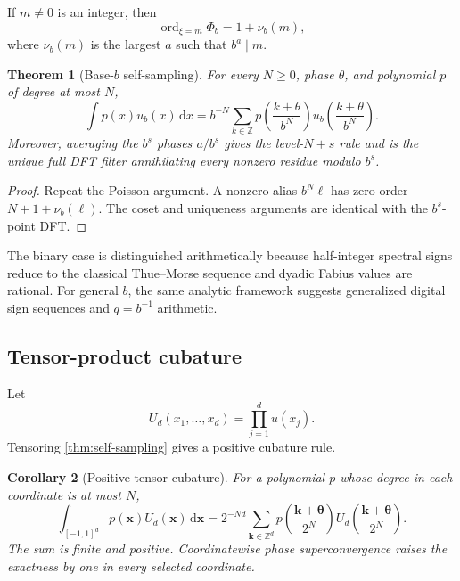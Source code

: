 \documentclass[11pt]{article}
\numberwithin{equation}{section}
\newtheorem{theorem}{Theorem}[section]
\newtheorem{corollary}[theorem]{Corollary}
\theoremstyle{definition}
\theoremstyle{remark}
\DeclareMathOperator{\ord}{ord}
\newcommand{\Z}{\mathbb Z}
\newcommand{\dd}{\,\mathrm d}
\begin{document}
If $m\ne0$ is an integer, then
\begin{equation}
 \ord_{\xi=m}\Phi_b=1+\nu_b(m),
 \label{eq:b-multiplicity}
\end{equation}
where $\nu_b(m)$ is the largest $a$ such that $b^a\mid m$.

\begin{theorem}[Base-$b$ self-sampling]
\label{thm:base-b}
For every $N\ge0$, phase $\theta$, and polynomial $p$ of degree at most $N$,
\begin{equation}
 \int p(x)u_b(x)\dd x
 =b^{-N}\sum_{k\in\Z}
 p\!\left(\frac{k+\theta}{b^N}\right)
 u_b\!\left(\frac{k+\theta}{b^N}\right).
 \label{eq:base-b-self-sampling}
\end{equation}
Moreover, averaging the $b^s$ phases $a/b^s$ gives the level-$N+s$ rule and is the unique full DFT filter annihilating every nonzero residue modulo $b^s$.
\end{theorem}

\begin{proof}
Repeat the Poisson argument.  A nonzero alias $b^N\ell$ has zero order $N+1+\nu_b(\ell)$.  The coset and uniqueness arguments are identical with the $b^s$-point DFT.
\end{proof}

The binary case is distinguished arithmetically because half-integer spectral signs reduce to the classical Thue--Morse sequence and dyadic Fabius values are rational.  For general $b$, the same analytic framework suggests generalized digital sign sequences and $q=b^{-1}$ arithmetic.

\subsection{Tensor-product cubature}

Let
\begin{equation}
 U_d(x_1,\ldots,x_d)=\prod_{j=1}^{d}u(x_j).
 \label{eq:tensor-density}
\end{equation}
Tensoring \cref{thm:self-sampling} gives a positive cubature rule.

\begin{corollary}[Positive tensor cubature]
\label{cor:tensor-cubature}
For a polynomial $p$ whose degree in each coordinate is at most $N$,
\begin{equation}
 \int_{[-1,1]^d}p(\bm x)U_d(\bm x)\dd\bm x
 =2^{-Nd}\sum_{\bm k\in\Z^d}
 p\!\left(\frac{\bm k+\bm\theta}{2^N}\right)
 U_d\!\left(\frac{\bm k+\bm\theta}{2^N}\right).
 \label{eq:tensor-cubature}
\end{equation}
The sum is finite and positive.  Coordinatewise phase superconvergence raises the exactness by one in every selected coordinate.
\end{corollary}
\end{document}
